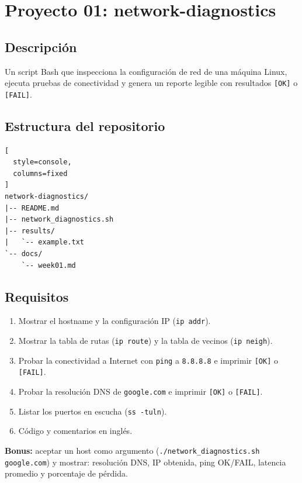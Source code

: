 \documentclass[11pt,a4paper]{article}
\theoremstyle{definition}
\theoremstyle{remark}
\newcommand{\cmd}[1]{\texttt{#1}}
\begin{document}
\section{Proyecto 01: network-diagnostics}\label{sec:proyecto}

\subsection{Descripción}

Un script Bash que inspecciona la configuración de red de una máquina Linux, ejecuta pruebas de conectividad y genera un reporte legible con resultados \texttt{[OK]} o \texttt{[FAIL]}.

\subsection{Estructura del repositorio}

\begin{lstlisting}[
  style=console,
  columns=fixed
]
network-diagnostics/
|-- README.md
|-- network_diagnostics.sh
|-- results/
|   `-- example.txt
`-- docs/
    `-- week01.md
\end{lstlisting}

\subsection{Requisitos}

\begin{enumerate}
  \item Mostrar el hostname y la configuración IP (\cmd{ip addr}).
  \item Mostrar la tabla de rutas (\cmd{ip route}) y la tabla de vecinos (\cmd{ip neigh}).
  \item Probar la conectividad a Internet con \cmd{ping} a \texttt{8.8.8.8} e imprimir \texttt{[OK]} o \texttt{[FAIL]}.
  \item Probar la resolución DNS de \texttt{google.com} e imprimir \texttt{[OK]} o \texttt{[FAIL]}.
  \item Listar los puertos en escucha (\cmd{ss -tuln}).
  \item Código y comentarios en inglés.
\end{enumerate}

\textbf{Bonus:} aceptar un host como argumento (\texttt{./network\_diagnostics.sh google.com}) y mostrar: resolución DNS, IP obtenida, ping OK/FAIL, latencia promedio y porcentaje de pérdida.
\end{document}
